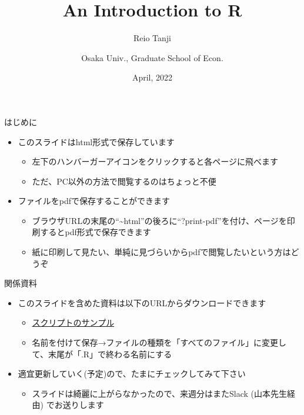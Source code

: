 \documentclass[
  ignorenonframetext,
]{beamer}
\title{An Introduction to R}
\author{Reio Tanji \and Osaka Univ., Graduate School of Econ.}
\date{April, 2022}
\providecommand{\tightlist}{%
  \setlength{\itemsep}{0pt}\setlength{\parskip}{0pt}}
\begin{document}
\frame{\titlepage}

\begin{frame}{はじめに}
\protect\hypertarget{ux306fux3058ux3081ux306b}{}
\begin{itemize}
\tightlist
\item
  このスライドはhtml形式で保存しています

  \begin{itemize}
  \tightlist
  \item
    左下のハンバーガーアイコンをクリックすると各ページに飛べます
  \item
    ただ、PC以外の方法で閲覧するのはちょっと不便
  \end{itemize}
\item
  ファイルをpdfで保存することができます

  \begin{itemize}
  \tightlist
  \item
    ブラウザURLの末尾の``\textasciitilde html''の後ろに``?print-pdf''を付け、ページを印刷するとpdf形式で保存できます
  \item
    紙に印刷して見たい、単純に見づらいからpdfで閲覧したいという方はどうぞ
  \end{itemize}
\end{itemize}

\begin{block}{関係資料}
\protect\hypertarget{ux95a2ux4fc2ux8cc7ux6599}{}
\begin{itemize}
\tightlist
\item
  このスライドを含めた資料は以下のURLからダウンロードできます

  \begin{itemize}
  \tightlist
  \item
    \href{https://raw.githubusercontent.com/T-Reio/r_introduction/main/script/script_sample.R}{スクリプトのサンプル}
  \item
    名前を付けて保存→ファイルの種類を「すべてのファイル」に変更して、末尾が「.R」で終わる名前にする
  \end{itemize}
\item
  適宜更新していく(予定)ので、たまにチェックしてみて下さい

  \begin{itemize}
  \tightlist
  \item
    スライドは綺麗に上がらなかったので、来週分はまたSlack (山本先生経由)
    でお送りします
  \end{itemize}
\end{itemize}
\end{block}


\end{frame}
\end{document}
